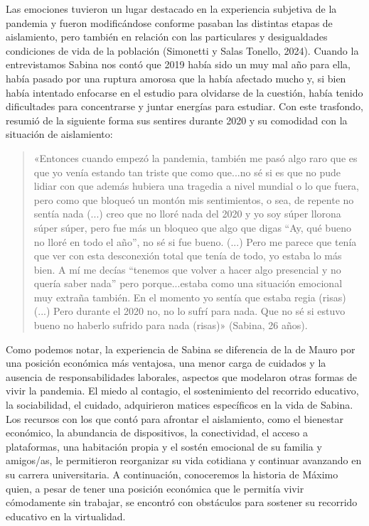 Las emociones tuvieron un lugar destacado en la experiencia subjetiva de la pandemia y fueron modificándose conforme pasaban las distintas etapas de aislamiento, pero también en relación con las particulares y desigualdades condiciones de vida de la población (Simonetti y Salas Tonello, 2024). Cuando la entrevistamos Sabina nos contó que 2019 había sido un muy mal año para ella, había pasado por una ruptura amorosa que la había afectado mucho y, si bien había intentado enfocarse en el estudio para olvidarse de la cuestión, había tenido dificultades para concentrarse y juntar energías para estudiar. Con este trasfondo, resumió de la siguiente forma sus sentires durante 2020 y su comodidad con la situación de aislamiento:

\begin{quote}
«Entonces cuando empezó la pandemia, también me pasó algo raro que es que yo venía estando tan triste que como que...no sé si es que no pude lidiar con que además hubiera una tragedia a nivel mundial o lo que fuera, pero como que bloqueó un montón mis sentimientos, o sea, de repente no sentía nada (...) creo que no lloré nada del 2020 y yo soy súper llorona súper súper, pero fue más un bloqueo que algo que digas ``Ay, qué bueno no lloré en todo el año'', no sé si fue bueno. (...) Pero me parece que tenía que ver con esta desconexión total que tenía de todo, yo estaba lo más bien. A mí me decías ``tenemos que volver a hacer algo presencial y no quería saber nada'' pero porque...estaba como una situación emocional muy extraña también. En el momento yo sentía que estaba regia (risas) (...) Pero durante el 2020 no, no lo sufrí para nada. Que no sé si estuvo bueno no haberlo sufrido para nada (risas)» (Sabina, 26 años).
\end{quote}

Como podemos notar, la experiencia de Sabina se diferencia de la de Mauro por una posición económica más ventajosa, una menor carga de cuidados y la ausencia de responsabilidades laborales, aspectos que modelaron otras formas de vivir la pandemia. El miedo al contagio, el sostenimiento del recorrido educativo, la sociabilidad, el cuidado, adquirieron matices específicos en la vida de Sabina. Los recursos con los que contó para afrontar el aislamiento, como el bienestar económico, la abundancia de dispositivos, la conectividad, el acceso a plataformas, una habitación propia y el sostén emocional de su familia y amigos/as, le permitieron reorganizar su vida cotidiana y continuar avanzando en su carrera universitaria. A continuación, conoceremos la historia de Máximo quien, a pesar de tener una posición económica que le permitía vivir cómodamente sin trabajar, se encontró con obstáculos para sostener su recorrido educativo en la virtualidad.

